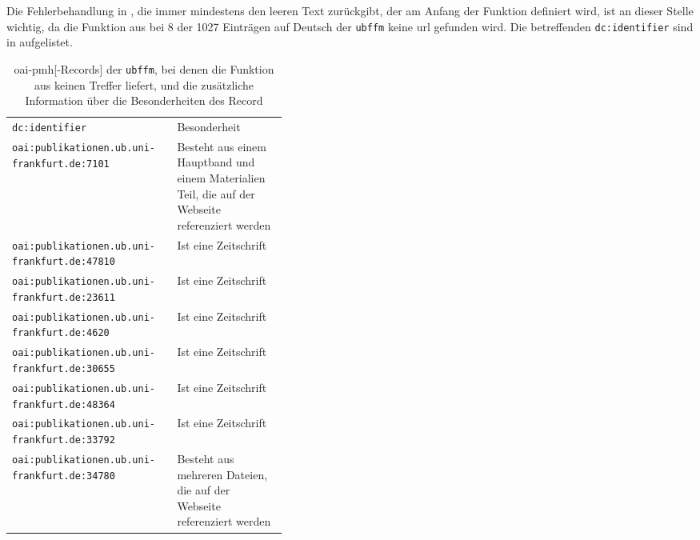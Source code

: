 Die Fehlerbehandlung in ,
die immer mindestens den leeren Text zurückgibt,
der am Anfang der Funktion definiert wird,
ist an dieser Stelle wichtig,
da die Funktion aus 
bei 8 der 1027 Einträgen auf Deutsch der \texttt{ubffm}
keine \gls{url} gefunden wird.
Die betreffenden \texttt{dc:identifier} sind in 
aufgelistet.

\begin{table}
	\begin{tabularx}{\textwidth}{l p{0.4\linewidth}}
		\texttt{dc:identifier}                               & Besonderheit                                                                                          \\
		\texttt{oai:publikationen.ub.uni-frankfurt.de:7101}  & Besteht aus einem Hauptband und einem Materialien Teil, die auf der Webseite referenziert werden \\
		\texttt{oai:publikationen.ub.uni-frankfurt.de:47810} & Ist eine Zeitschrift                                                                             \\
		\texttt{oai:publikationen.ub.uni-frankfurt.de:23611} & Ist eine Zeitschrift                                                                             \\
		\texttt{oai:publikationen.ub.uni-frankfurt.de:4620}  & Ist eine Zeitschrift                                                                             \\
		\texttt{oai:publikationen.ub.uni-frankfurt.de:30655} & Ist eine Zeitschrift                                                                             \\
		\texttt{oai:publikationen.ub.uni-frankfurt.de:48364} & Ist eine Zeitschrift                                                                             \\
		\texttt{oai:publikationen.ub.uni-frankfurt.de:33792} & Ist eine Zeitschrift                                                                             \\
		\texttt{oai:publikationen.ub.uni-frankfurt.de:34780} & Besteht aus mehreren Dateien, die auf der Webseite referenziert werden                           \\
	\end{tabularx}
	\caption{\gls{oai-pmh}[-Records] der \texttt{ubffm},
		bei denen die Funktion aus  keinen Treffer liefert,
		und die zusätzliche Information über die Besonderheiten des Record
	}
	\label{tbl:find_pdf_urls:failed}
\end{table}



